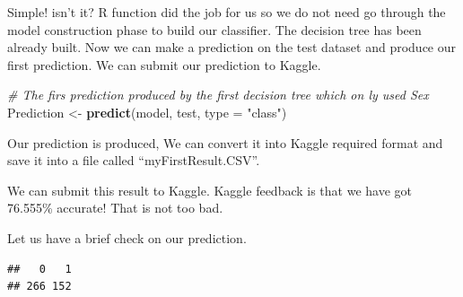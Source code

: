 \documentclass[
]{book}
\newenvironment{Shaded}{\begin{snugshade}}{\end{snugshade}}
\newcommand{\CommentTok}[1]{\textcolor[rgb]{0.56,0.35,0.01}{\textit{#1}}}
\newcommand{\DataTypeTok}[1]{\textcolor[rgb]{0.13,0.29,0.53}{#1}}
\newcommand{\KeywordTok}[1]{\textcolor[rgb]{0.13,0.29,0.53}{\textbf{#1}}}
\newcommand{\NormalTok}[1]{#1}
\newcommand{\OperatorTok}[1]{\textcolor[rgb]{0.81,0.36,0.00}{\textbf{#1}}}
\newcommand{\OtherTok}[1]{\textcolor[rgb]{0.56,0.35,0.01}{#1}}
\newcommand{\StringTok}[1]{\textcolor[rgb]{0.31,0.60,0.02}{#1}}
\begin{document}
Simple! isn't it? R function did the job for us so we do not need go through the model construction phase to build our classifier. The decision tree has been already built. Now we can make a prediction on the test dataset and produce our first prediction. We can submit our prediction to Kaggle.

\begin{Shaded}
\begin{Highlighting}[]
\CommentTok{# The firs prediction produced by the first decision tree which on ly used Sex}
\NormalTok{Prediction <-}\StringTok{ }\KeywordTok{predict}\NormalTok{(model, test, }\DataTypeTok{type =} \StringTok{"class"}\NormalTok{)}
\end{Highlighting}
\end{Shaded}

Our prediction is produced, We can convert it into Kaggle required format and save it into a file called ``myFirstResult.CSV''.

\begin{Shaded}
\end{Shaded}

We can submit this result to Kaggle. Kaggle feedback is that we have got 76.555\% accurate! That is not too bad.

Let us have a brief check on our prediction.

\begin{Shaded}
\end{Shaded}

\begin{verbatim}
##   0   1 
## 266 152
\end{verbatim}
\end{document}
